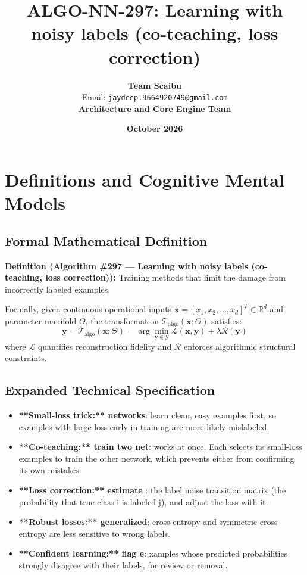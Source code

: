 \documentclass[11pt,a4paper]{article}
\title{\textbf{ALGO-NN-297: Learning with noisy labels (co-teaching, loss correction)}}
\author{\textbf{Team Scaibu} \\ \small Email: \texttt{jaydeep.9664920749@gmail.com} \\ \small \textbf{Architecture and Core Engine Team}}
\date{\textbf{October 2026}}
\theoremstyle{definition}
\begin{document}
\maketitle

\section{Definitions and Cognitive Mental Models}

\subsection{Formal Mathematical Definition}
\textbf{Definition (Algorithm \#297 --- Learning with noisy labels (co-teaching, loss correction)):}
Training methods that limit the damage from incorrectly labeled examples.

Formally, given continuous operational inputs $\mathbf{x} = [x_1, x_2, \dots, x_d]^T \in \mathbb{R}^d$ and parameter manifold $\Theta$, the transformation $\mathcal{T}_{\text{algo}}(\mathbf{x}; \Theta)$ satisfies:
{\boldmath
\begin{equation}
\mathbf{y} = \mathcal{T}_{\text{algo}}(\mathbf{x}; \Theta) = \arg\min_{\mathbf{y} \in \mathcal{Y}} \mathcal{L}(\mathbf{x}, \mathbf{y}) + \lambda \mathcal{R}(\mathbf{y})
\end{equation}
}
where $\mathcal{L}$ quantifies reconstruction fidelity and $\mathcal{R}$ enforces algorithmic structural constraints.

\subsection{Expanded Technical Specification}
\begin{itemize}
\item \textbf{**Small-loss trick:** networks}:  learn clean, easy examples first, so examples with large loss early in training are more likely mislabeled.
\item \textbf{**Co-teaching:** train two net}: works at once. Each selects its small-loss examples to train the other network, which prevents either from confirming its own mistakes.
\item \textbf{**Loss correction:** estimate }: the label noise transition matrix (the probability that true class i is labeled j), and adjust the loss with it.
\item \textbf{**Robust losses:** generalized}:  cross-entropy and symmetric cross-entropy are less sensitive to wrong labels.
\item \textbf{**Confident learning:** flag e}: xamples whose predicted probabilities strongly disagree with their labels, for review or removal.
\end{itemize}
\end{document}
